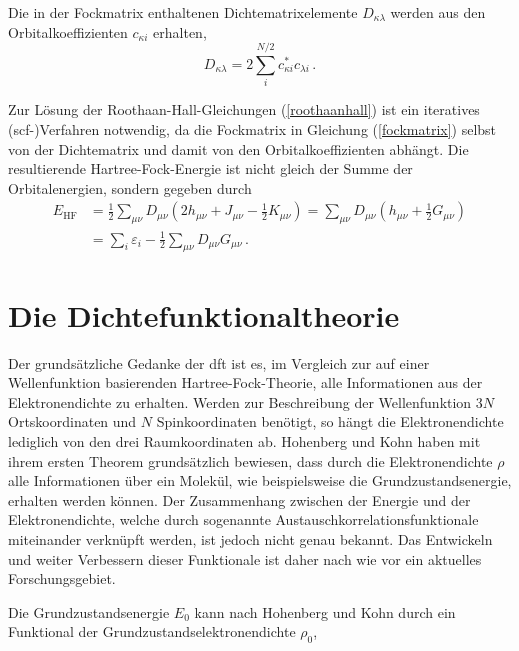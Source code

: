 Die in der Fockmatrix enthaltenen Dichtematrixelemente $D_{\kappa\lambda}$ werden aus den Orbitalkoeffizienten $c_{\kappa i}$ erhalten,
\begin{equation}
D_{\kappa\lambda}=2\sum_{i}^{N/2} c_{\kappa i}^* c_{\lambda i}\, .
\end{equation}

Zur Lösung der Roothaan-Hall-Gleichungen (\ref{roothaanhall}) ist ein iteratives \mbox{(\acs{scf}-)}Verfahren notwendig, da die Fockmatrix in Gleichung (\ref{fockmatrix}) selbst von der Dichtematrix und damit von den Orbitalkoeffizienten abhängt. Die resultierende Hartree-Fock-Energie ist nicht gleich der Summe der Orbitalenergien, sondern gegeben durch
\begin{equation}
\begin{aligned}
E_{\textrm{HF}}&=\frac{1}{2}\sum_{\mu\nu}D_{\mu\nu}(2h_{\mu\nu}+J_{\mu\nu}-\frac{1}{2} K_{\mu\nu})=\sum_{\mu\nu}D_{\mu\nu}(h_{\mu\nu}+\frac{1}{2}G_{\mu\nu})\\
&=\sum_i\varepsilon_i-\frac{1}{2}\sum_{\mu\nu}D_{\mu\nu}G_{\mu\nu}\, .
\end{aligned}
\label{hfenergie}
\end{equation}

\section{Die Dichtefunktionaltheorie}\label{kap:dft}

Der grundsätzliche Gedanke der \acf{dft} ist es, im Vergleich zur auf einer Wellenfunktion basierenden Hartree-Fock-Theorie, alle Informationen aus der Elektronendichte zu erhalten. Werden zur Beschreibung der Wellenfunktion $3N$ Ortskoordinaten und $N$ Spinkoordinaten benötigt, so hängt die Elektronendichte lediglich von den drei Raumkoordinaten ab. Hohenberg und Kohn\supercite{hohenberg1964inhomogeneous} haben mit ihrem ersten Theorem grundsätzlich bewiesen, dass durch die Elektronendichte $\rho$ alle Informationen über ein Molekül, wie beispielsweise die Grundzustandsenergie, erhalten werden können. Der Zusammenhang zwischen der Energie und der Elektronendichte, welche durch sogenannte Austauschkorrelationsfunktionale miteinander verknüpft werden, ist jedoch nicht genau bekannt. Das Entwickeln und weiter Verbessern dieser Funktionale ist daher nach wie vor ein aktuelles Forschungsgebiet.  

Die Grundzustandsenergie $E_0$ kann nach Hohenberg und Kohn durch ein Funktional der Grundzustandselektronendichte $\rho_0$,

